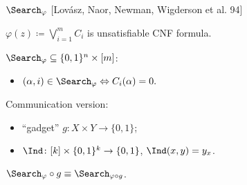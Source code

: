 \begin{frame}{$\Search_{\varphi}$ [Lov{\'{a}}sz, Naor, Newman, Wigderson et al. 94]}
    
    $\varphi(z) \coloneqq \bigvee\limits_{i = 1}^{m} C_i$ is unsatisfiable CNF formula.
    \pause
    
    $\Search_{\varphi} \subseteq \{0, 1\}^n \times [m]$:
    \begin{itemize}
        \item $(\alpha, i) \in \Search_{\varphi} \Leftrightarrow C_{i}(\alpha) = 0.$
    \end{itemize}

    \pause
    \vspace{0.1cm}
    Communication version:
    \begin{itemize}
        \item ``gadget'' $g\colon X \times Y \to \{0, 1\}$;
        \item $\Ind\colon [k] \times \{0, 1\}^k \to \{0, 1\}$, $\Ind(x, y) = y_x$.
    \end{itemize}

    \pause
    \begin{center}
        
    \end{center}


    $\Search_{\varphi} \circ g \equiv \Search_{\varphi \circ g}$.
\end{frame}


